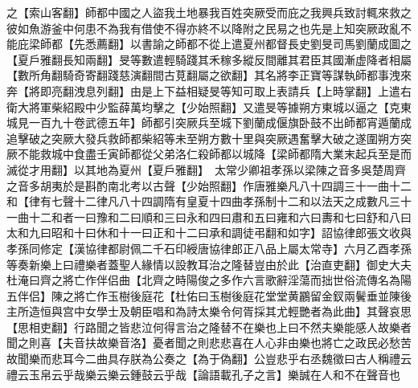之【索山客翻】師都中國之人盜我土地暴我百姓突厥受而庇之我興兵致討輒來救之彼如魚游釜中何患不為我有借使不得亦終不以降附之民易之也先是上知突厥政亂不能庇梁師都【先悉薦翻】以書諭之師都不從上遣夏州都督長史劉旻司馬劉蘭成圖之【夏戶雅翻長知兩翻】旻等數遣輕騎踐其禾稼多縱反間離其君臣其國漸虚降者相屬【數所角翻騎奇寄翻踐慈演翻間古莧翻屬之欲翻】其名將李正寶等謀執師都事洩來奔【將即亮翻洩息列翻】由是上下益相疑旻等知可取上表請兵【上時掌翻】上遣右衛大將軍柴紹殿中少監薛萬均擊之【少始照翻】又遣旻等據朔方東城以逼之【克東城見一百九十卷武德五年】師都引突厥兵至城下劉蘭成偃旗卧鼓不出師都宵遁蘭成追擊破之突厥大發兵救師都柴紹等未至朔方數十里與突厥遇奮擊大破之遂圍朔方突厥不能救城中食盡壬寅師都從父弟洛仁殺師都以城降【梁師都隋大業末起兵至是而滅從才用翻】以其地為夏州【夏戶雅翻】　太常少卿祖孝孫以梁陳之音多吳楚周齊之音多胡夷於是斟酌南北考以古聲【少始照翻】作唐雅樂凡八十四調三十一曲十二和【律有七聲十二律凡八十四調隋有皇夏十四曲孝孫制十二和以法天之成數凡三十一曲十二和者一曰豫和二曰順和三曰永和四曰肅和五曰雍和六曰夀和七曰舒和八曰太和九曰昭和十曰休和十一曰正和十二曰承和調徒弔翻和如字】詔協律郎張文收與孝孫同修定【漢協律都尉佩二千石印綬唐協律郎正八品上屬太常寺】六月乙酉孝孫等奏新樂上曰禮樂者蓋聖人緣情以設教耳治之隆替豈由於此【治直吏翻】御史大夫杜淹曰齊之將亡作伴侣曲【北齊之時陽俊之多作六言歌辭淫蕩而拙世俗流傳名為陽五伴侣】陳之將亡作玉樹後庭花【杜佑曰玉樹後庭花堂堂黄鸝留金釵兩鬢垂並陳後主所造恒與宫中女學士及朝臣唱和為詩太樂令何胥採其尤輕艷者為此曲】其聲哀思【思相吏翻】行路聞之皆悲泣何得言治之隆替不在樂也上曰不然夫樂能感人故樂者聞之則喜【夫音扶故樂音洛】憂者聞之則悲悲喜在人心非由樂也將亡之政民必愁苦故聞樂而悲耳今二曲具存朕為公奏之【為于偽翻】公豈悲乎右丞魏徵曰古人稱禮云禮云玉帛云乎哉樂云樂云鍾鼓云乎哉【論語載孔子之言】樂誠在人和不在聲音也

